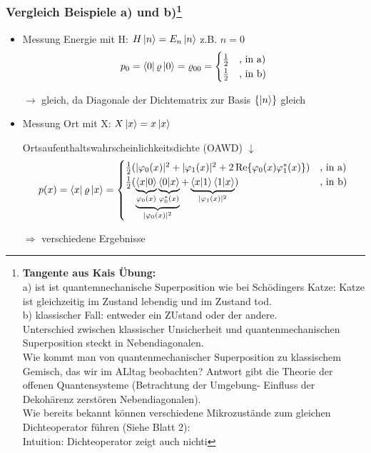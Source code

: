 \subsubsection*{Vergleich Beispiele a) und b)\footnote{\textbf{Tangente aus Kais Übung:} \\ a) ist ist quantemnechanische Superposition wie bei Schödingers Katze: Katze ist gleichzeitig im Zustand lebendig und im Zustand tod.\\ b) klassischer Fall: entweder ein ZUstand oder der andere. \\ Unterschied zwischen klassischer Unsicherheit und quantenmechanischen Superposition steckt in Nebendiagonalen. \\Wie kommt man von quantenmechanischer Superposition zu klassischem Gemisch, das wir im ALltag beobachten? Antwort gibt die Theorie der offenen Quantensysteme (Betrachtung der Umgebung- Einfluss der Dekohärenz zerstören Nebendiagonalen). \\
Wie bereits bekannt können verschiedene Mikrozustände zum gleichen Dichteoperator führen (Siehe Blatt 2): \\ Intuition: Dichteoperator zeigt auch nichti}}
\begin{itemize}
    \item Messung Energie mit H: $H \ket{n} = E_n \ket{n}$ z.B. $ n = 0$
    \begin{equation}
        p_0 = \bra{0} \varrho \ket{0} = \varrho_{00} = \begin{cases}
            \frac{1}{2} & \text{, in a)} \\
            \frac{1}{2} & \text{, in b)}
        \end{cases}
    \end{equation}
    \item[$\rightarrow$] gleich, da Diagonale der Dichtematrix zur Basis $\{\ket{n}\}$ gleich
    \item Messung Ort mit X: $X \ket{x} = x \ket{x}$
    \item[] Ortsaufenthaltswahrscheinlichkeitsdichte (OAWD) $\downarrow$  
    \begin{equation}
         p(x) = \bra{x} \varrho \ket{x} = \begin{cases}
            \frac{1}{2}(|\varphi_0(x)|^2 + |\varphi_1(x)|^2 + 2 \Re{\varphi_0(x) \varphi_1^*(x)}) & \text{, in a)} \\
             \frac{1}{2}(\underbrace{\underbrace{ \bra{x} \ket{0}}_{\varphi_0(x)} \underbrace{\bra{0} \ket{x}}_{\varphi_0^*(x)}}_{|\varphi_0(x)|^2} + \underbrace{\bra{x} \ket{1} \bra{1} \ket{x}}_{|\varphi_1(x)|^2}) & \text{, in b)}
         \end{cases}
    \end{equation}
    \item[$\Rightarrow$] verschiedene Ergebnisse
\end{itemize}

